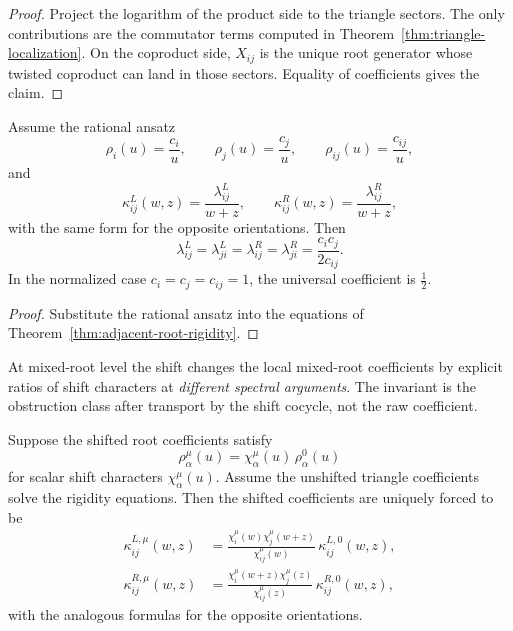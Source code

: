 \begin{proof}
Project the logarithm of the product side to the triangle sectors.
The only contributions are the commutator terms computed in
Theorem~\ref{thm:triangle-localization}. On the coproduct side,
$X_{ij}$ is the unique root generator whose twisted coproduct can land in
those sectors. Equality of coefficients gives the claim.
\end{proof}

\begin{corollary}
Assume the rational ansatz
\[
\rho_i(u)=\frac{c_i}{u},
\qquad
\rho_j(u)=\frac{c_j}{u},
\qquad
\rho_{ij}(u)=\frac{c_{ij}}{u},
\]
and
\[
\kappa_{ij}^{L}(w,z)=\frac{\lambda_{ij}^{L}}{w+z},
\qquad
\kappa_{ij}^{R}(w,z)=\frac{\lambda_{ij}^{R}}{w+z},
\]
with the same form for the opposite orientations. Then
\[
\lambda_{ij}^{L}=
\lambda_{ji}^{L}=
\lambda_{ij}^{R}=
\lambda_{ji}^{R}=
\frac{c_ic_j}{2c_{ij}}.
\]
In the normalized case $c_i=c_j=c_{ij}=1$, the universal coefficient is
$\frac12$.
\end{corollary}

\begin{proof}
Substitute the rational ansatz into the equations of
Theorem~\ref{thm:adjacent-root-rigidity}.
\end{proof}

\begin{remark}
\label{rem:transport-not-invariance}
At mixed-root level the shift changes the local mixed-root coefficients
by explicit ratios of shift characters at \emph{different spectral
arguments}. The invariant is the obstruction class after transport by
the shift cocycle, not the raw coefficient.
\end{remark}

\begin{proposition}
\label{prop:triangle-shift-transport}
Suppose the shifted root coefficients satisfy
\[
\rho_\alpha^{\mu}(u)=\chi_\alpha^{\mu}(u)\,\rho_\alpha^{0}(u)
\]
for scalar shift characters $\chi_\alpha^{\mu}(u)$.
Assume the unshifted triangle coefficients solve the rigidity equations.
Then the shifted coefficients are uniquely forced to be
\begin{align*}
\kappa_{ij}^{L,\mu}(w,z)
&=
\frac{\chi_i^{\mu}(w)\chi_j^{\mu}(w+z)}{\chi_{ij}^{\mu}(w)}
\,\kappa_{ij}^{L,0}(w,z),\\
\kappa_{ij}^{R,\mu}(w,z)
&=
\frac{\chi_i^{\mu}(w+z)\chi_j^{\mu}(z)}{\chi_{ij}^{\mu}(z)}
\,\kappa_{ij}^{R,0}(w,z),
\end{align*}
with the analogous formulas for the opposite orientations.
\end{proposition}

